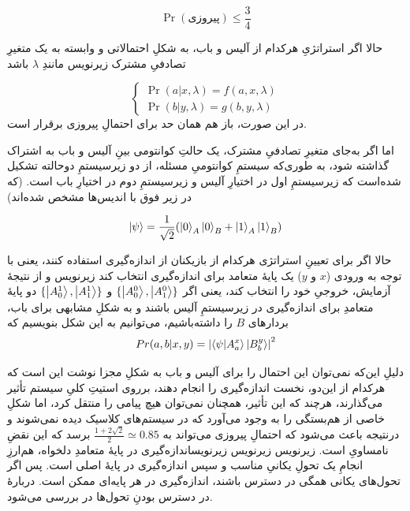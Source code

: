 \documentclass[a4paper,12pt]{article}
\begin{document}
\begin{equation}
    \label{معادله:بل-بازی}
    \Pr(\text{پیروزی}) \le \frac{3}{4}
\end{equation}

حالا اگر استراتژیِ هرکدام از آلیس و باب، به شکلِ احتمالاتی و وابسته به یک متغیرِ تصادفیِ مشترک ‌زیرنویس مانندِ 
\(\lambda\)
باشد

\begin{equation}
\begin{cases}
    \Pr(a | x, \lambda) = f(a, x, \lambda) \\
    \Pr(b | y, \lambda) = g(b, y, \lambda)
\end{cases}
\end{equation}
در این صورت، باز هم همان حد برای احتمالِ پیروزی برقرار است.

اما اگر به‌جای متغیرِ تصادفیِ مشترک، یک حالتِ کوانتومی بینِ آلیس و باب به اشتراک گذاشته شود، به طوری‌که سیستمِ کوانتومیِ مسئله، از دو زیرسیستمِ دوحالته تشکیل شده‌است که زیرسیستمِ اول در اختیارِ آلیس و زیرسیستمِ دوم در اختیارِ باب است. (که در زیر فوق با اندیس‌ها مشخص شده‌اند)

\begin{equation}
    \ket\psi = \frac{1}{\sqrt{2}} (\ket{0}_A\ket{0}_B + \ket{1}_A\ket{1}_B) 
\end{equation}

حالا اگر برای تعیینِ استراتژی هرکدام از بازیکنان از اندازه‌گیری استفاده کنند، یعنی با توجه به ورودی
(\(x\) و \(y\))
یک پایهٔ متعامد برای اندازه‌گیری انتخاب کند ‌زیرنویس و از نتیجهٔ آزمایش، خروجیِ خود را انتخاب کند، یعنی اگر
\( \{\ket{A^0_0}, \ket{A^0_1} \} \)
و 
\( \{\ket{A^1_0}, \ket{A^1_1} \} \)
دو پایهٔ متعامدِ برای اندازه‌گیری در زیرسیستمِ آلیس باشند و به شکلِ مشابهی برای باب، بردارهای 
\(B\)
را داشته‌باشیم، می‌توانیم به این شکل بنویسیم که
\begin{equation}
    Pr(a, b | x, y) = \abs{\bra\psi \ket{A^x_a} \ket{B^y_b}}^2
\end{equation}

دلیلِ این‌که نمی‌توان این احتمال را برای آلیس و باب به شکلِ مجزا نوشت این است که هرکدام از این‌دو، نخست اندازه‌گیری را انجام دهند، برروی استیتِ کلیِ سیستم تأثیر می‌گذارند، هرچند که این تأثیر، همچنان نمی‌توان هیچ پیامی را منتقل کرد، اما شکلِ خاصی از هم‌بستگی را به وجود می‌آورد که در سیستم‌های کلاسیک دیده نمی‌شوند و درنتیجه باعث می‌شود که احتمالِ پیروزی می‌تواند به 
\( \frac{1 + 2\sqrt{2}}{2} \simeq 0.85 \)
برسد که این نقضِ نامساویِ  است.
‌زیرنویس{}
‌زیرنویس{}
‌زیرنویس{اندازه‌گیری در پایهٔ متعامدِ دلخواه، هم‌ارزِ انجامِ یک تحولِ یکانیِ مناسب و سپس اندازه‌گیری در پایهٔ اصلی است. پس اگر تحول‌های یکانی همگی در دسترس باشند، اندازه‌گیری در هر پایه‌ای ممکن است. دربارهٔ در دسترس بودنِ تحول‌ها در  بررسی می‌شود.}
\end{document}
